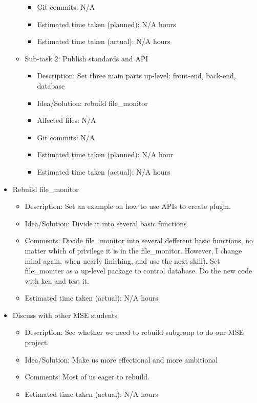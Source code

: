 \documentclass{article}
\begin{document}
\begin{itemize}
\begin{itemize}
\begin{itemize}
					\item Git commits: N/A
					\item Estimated time taken (planned): N/A hours
					\item Estimated time taken (actual): N/A hours
				 \end{itemize}
	         \item Sub-task 2: Publish standards and API
	            \begin{itemize}
				    \item Description: Set three main parts up-level: front-end, back-end, database
					\item Idea/Solution: rebuild file\_monitor 
					\item Affected files: N/A
					\item Git commits: N/A
					\item Estimated time taken (planned): N/A hour
					\item Estimated time taken (actual): N/A hours
				 \end{itemize}
	     \end{itemize}
	\item Rebuild file\_monitor
	     \begin{itemize}
	         \item Description: Set an example on how to use APIs to create plugin. 
	         \item Idea/Solution: Divide it into several basic functions
	         \item Comments: Divide file\_monitor into several defferent basic functions, no matter which of privilege it is in the file\_monitor. However, I change mind again, when nearly finishing, and use the next skill). Set file\_moniter as a up-level package to control database. Do the new code with ken and test it.
	         \item Estimated time taken (actual): N/A hours
	     \end{itemize}
	\item Discuss with other MSE students
	     \begin{itemize}
	         \item Description: See whether we need to rebuild subgroup to do our MSE project. 
	         \item Idea/Solution: Make us more effectional and more ambitional
	         \item Comments: Most of us eager to rebuild.
	         \item Estimated time taken (actual): N/A hours
	     \end{itemize}

\end{itemize}
\end{document}
